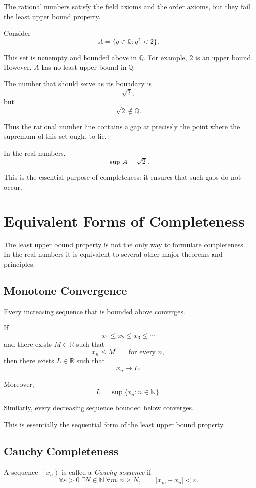 \documentclass{essay}
\begin{document}
The rational numbers satisfy the field axioms and the order axioms, but they fail the least upper bound property.

Consider
\[ A=\{q\in\mathbb{Q}:q^{2}<2\}. \]

This set is nonempty and bounded above in \(\mathbb{Q}\). For example, \(2\) is an upper bound. However, \(A\) has no least upper bound in \(\mathbb{Q}\).

The number that should serve as its boundary is
\[ \sqrt{2}, \]
but
\[ \sqrt{2}\notin\mathbb{Q}. \]

Thus the rational number line contains a gap at precisely the point where the supremum of this set ought to lie.

In the real numbers,
\[ \sup A=\sqrt{2}. \]

This is the essential purpose of completeness: it ensures that such gaps do not occur.

\section{Equivalent Forms of Completeness}

The least upper bound property is not the only way to formulate completeness. In the real numbers it is equivalent to several other major theorems and principles.

\subsection{Monotone Convergence}

Every increasing sequence that is bounded above converges.

If
\[ x_{1}\leq x_{2}\leq x_{3}\leq\cdots \]
and there exists \(M\in\mathbb{R}\) such that
\[ x_{n}\leq M \qquad \text{for every } n, \]
then there exists \(L\in\mathbb{R}\) such that
\[ x_{n}\to L. \]

Moreover,
\[ L=\sup\{x_{n}:n\in\mathbb{N}\}. \]

Similarly, every decreasing sequence bounded below converges.

This is essentially the sequential form of the least upper bound property.

\subsection{Cauchy Completeness}

A sequence \((x_{n})\) is called a \emph{Cauchy sequence} if
\[ \forall\varepsilon>0\;\exists N\in\mathbb{N}\; \forall m,n\geq N, \qquad |x_{m}-x_{n}|<\varepsilon. \]
\end{document}
